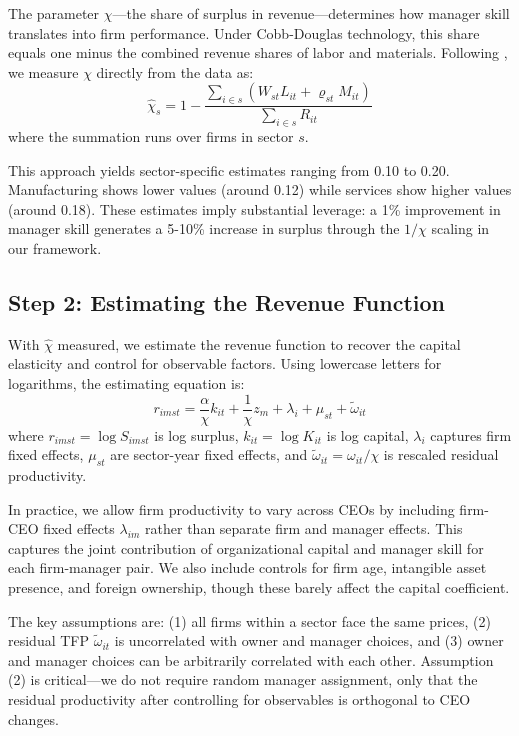 \documentclass[11pt,a4paper]{article}
\begin{document}
The parameter $\chi$—the share of surplus in revenue—determines how manager skill translates into firm performance. Under Cobb-Douglas technology, this share equals one minus the combined revenue shares of labor and materials. Following \citet{Gandhi2020-nu}, we measure $\chi$ directly from the data as:
\begin{equation}
\hat{\chi}_s = 1 - \frac{\sum_{i \in s}(W_{st}L_{it} + \varrho_{st}M_{it})}{\sum_{i \in s} R_{it}}
\end{equation}
where the summation runs over firms in sector $s$.

This approach yields sector-specific estimates ranging from 0.10 to 0.20. Manufacturing shows lower values (around 0.12) while services show higher values (around 0.18). These estimates imply substantial leverage: a 1\% improvement in manager skill generates a 5-10\% increase in surplus through the $1/\chi$ scaling in our framework.

\subsection{Step 2: Estimating the Revenue Function}

With $\hat{\chi}$ measured, we estimate the revenue function to recover the capital elasticity and control for observable factors. Using lowercase letters for logarithms, the estimating equation is:
\begin{equation}
r_{imst} = \frac{\alpha}{\chi} k_{it} + \frac{1}{\chi}z_m + \lambda_i + \mu_{st} + \tilde{\omega}_{it}
\end{equation}
where $r_{imst} = \log S_{imst}$ is log surplus, $k_{it} = \log K_{it}$ is log capital, $\lambda_i$ captures firm fixed effects, $\mu_{st}$ are sector-year fixed effects, and $\tilde{\omega}_{it} = \omega_{it}/\chi$ is rescaled residual productivity.

In practice, we allow firm productivity to vary across CEOs by including firm-CEO fixed effects $\lambda_{im}$ rather than separate firm and manager effects. This captures the joint contribution of organizational capital and manager skill for each firm-manager pair. We also include controls for firm age, intangible asset presence, and foreign ownership, though these barely affect the capital coefficient.

The key assumptions are: (1) all firms within a sector face the same prices, (2) residual TFP $\tilde{\omega}_{it}$ is uncorrelated with owner and manager choices, and (3) owner and manager choices can be arbitrarily correlated with each other. Assumption (2) is critical—we do not require random manager assignment, only that the residual productivity after controlling for observables is orthogonal to CEO changes.
\end{document}
